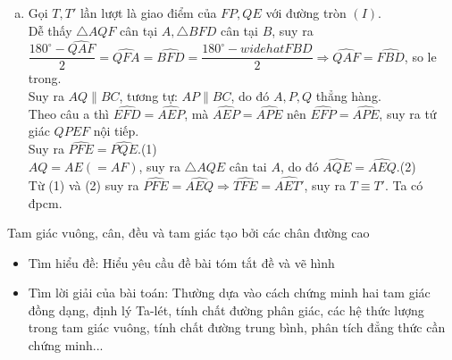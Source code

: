 \begin{bt}
{\begin{enumerate}[a)]
\begin{center}
				\end{center}
			\item Gọi $T,T'$ lần lượt là giao điểm của $FP,QE$ với đường tròn $(I)$.\\
			Dễ thấy $\triangle AQF$ cân tại $A, \triangle BFD$ cân tại $B$, suy ra $\dfrac{180^\circ-\widehat{QAF}}{2}=\widehat{QFA}=\widehat{BFD}=\dfrac{180^\circ-widehat{FBD}}{2}\Rightarrow \widehat{QAF}=\widehat{FBD}$, so le trong.\\
			Suy ra $AQ\parallel BC$, tương tự: $AP\parallel BC$, do đó $A,P,Q$ thẳng hàng.\\
			Theo câu a thì $\widehat{EFD}=\widehat{AEP}$, mà $\widehat{AEP}=\widehat{APE}$ nên $\widehat{EFP}=\widehat{APE}$, suy ra tứ giác $QPEF$ nội tiếp.\\
			Suy ra $\widehat{PFE}=\widehat{PQE}$.\hfill(1)\\
			$AQ=AE(=AF)$, suy ra $\triangle AQE$ cân tai $A$, do đó $\widehat{AQE}=\widehat{AEQ}$.\hfill(2)\\
			Từ (1) và (2) suy ra $\widehat{PFE}=\widehat{AEQ}\Rightarrow \widehat{TFE}=\widehat{AET'}$, suy ra $T\equiv T'$. Ta có đpcm.
		\end{enumerate}
	}
\end{bt}

\begin{dang}{Tam giác vuông, cân, đều và tam giác tạo bởi các chân đường cao}
	\begin{itemize}
		\item Tìm hiểu đề: Hiểu yêu cầu đề bài tóm tắt đề và vẽ hình
		\item Tìm lời giải của bài toán: Thường dựa vào cách chứng minh hai tam giác đồng dạng, định lý Ta-lét, tính chất đường phân giác, các hệ thức lượng trong tam giác vuông, tính chất đường trung bình, phân tích đẳng thức cần chứng minh...
	\end{itemize}
\end{dang}

